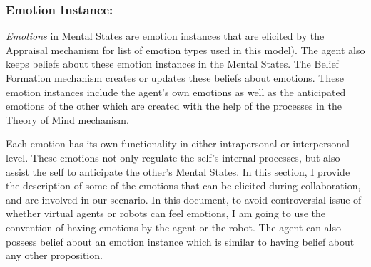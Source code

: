 \documentclass[letterpaper]{article}
\begin{document}
\subsubsection{Emotion Instance:}

\textit{Emotions} in Mental States are emotion instances that are elicited by
the Appraisal mechanism for list of emotion types used in this model). The agent
also keeps beliefs about these emotion instances in the Mental States. The
Belief Formation mechanism creates or updates these beliefs about emotions.
These emotion instances include the agent's own emotions as well as the
anticipated emotions of the other which are created with the help of the
processes in the Theory of Mind mechanism.

Each emotion has its own functionality in either intrapersonal or interpersonal
level. These emotions not only regulate the self's internal processes, but also
assist the self to anticipate the other's Mental States. In this section, I
provide the description of some of the emotions that can be elicited during
collaboration, and are involved in our scenario. In this document, to avoid
controversial issue of whether virtual agents or robots can feel emotions, I am
going to use the convention of having emotions by the agent or the robot. The
agent can also possess belief about an emotion instance which is similar to
having belief about any other proposition.
\end{document}
